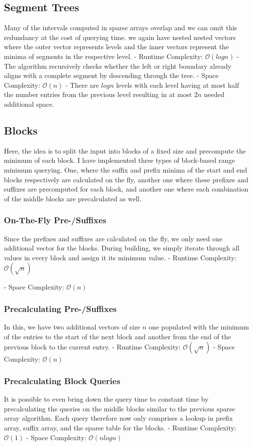 \documentclass[a4paper,UKenglish,cleveref,thm-restate]{lipics-v2021}
\begin{document}
\subsection{Segment Trees}
Many of the intervals computed in sparse arrays overlap and we can omit this redundancy at the cost of querying time. we again have nested nested vectors where the outer vector represents levels and the inner vectors represent the minima of segments in the respective level.  
- Runtime Complexity: $\mathcal{O}(log n)$
	- The algorithm recursively checks whether the left or right boundary already aligns with a complete segment by descending through the tree.
- Space Complexity: $\mathcal{O}(n)$
	- There are $log n$ levels with each level having at most half the number entries from the previous level resulting in at most $2n$ needed additional space.
\subsection{Blocks}
Here, the idea is to split the input into blocks of a fixed size and precompute the minimum of each block. I have implemented three types of block-based range minimum querying. One, where the suffix and prefix minima of the start and end blocks respectively are calculated on the fly, another one where these prefixes and suffixes are precomputed for each block, and another one where each combination of the middle blocks are precalculated as well.
\subsubsection{On-The-Fly Pre-/Suffixes}
Since the prefixes and suffixes are calculated on the fly, we only need one additional vector for the blocks. During building, we simply iterate through all values in every block and assign it its minimum value. 
- Runtime Complexity: $\mathcal{O}(\sqrt{n})$

- Space Complexity: $\mathcal{O}(n)$

\subsubsection{Precalculating Pre-/Suffixes}
In this, we have two additional vectors of size $n$ one populated with the minimum of the entries to the start of the next block and another from the end of the previous block to the current entry.
- Runtime Complexity: $\mathcal{O}(\sqrt{n})$
- Space Complexity: $\mathcal{O}(n)$
\subsubsection{Precalculating Block Queries}
It is possible to even bring down the query time to constant time by precalculating the queries on the middle blocks similar to the previous sparse array algorithm. Each query therefore now only comprises a lookup in prefix array, suffix array, and the sparse table for the blocks.
- Runtime Complexity: $\mathcal{O}(1)$
- Space Complexity: $\mathcal{O}(n log n)$
\end{document}
